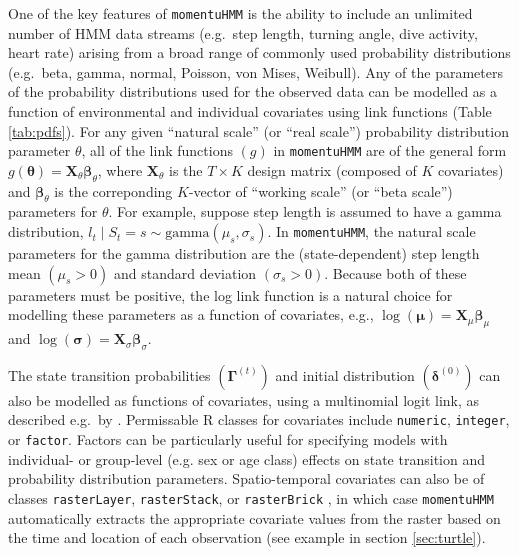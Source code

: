 \documentclass[12pt]{article}\usepackage[]{graphicx}\usepackage[]{color}
\begin{document}
One of the key features of \verb|momentuHMM| is the ability to include an unlimited number of HMM data streams (e.g.\ step length, turning angle, dive activity, heart rate) arising from a broad range of commonly used probability distributions (e.g.\ beta, gamma, normal, Poisson, von Mises, Weibull). Any of the parameters of the probability distributions used for the observed data can be modelled as a function of environmental and individual covariates using link functions (Table \ref{tab:pdfs}). For any given ``natural scale'' (or ``real scale'') probability distribution parameter $\theta$, all of the link functions $(g)$ in \verb|momentuHMM| are of the general form $g({\boldsymbol \theta}) =  {\mathbf X}_\theta{\boldsymbol \beta}_\theta$, where ${\mathbf X}_\theta$ is the $T \times K$ design matrix (composed of $K$ covariates) and ${\boldsymbol \beta}_\theta$ is the correponding $K$-vector of ``working scale'' (or ``beta scale'') parameters for $\theta$. For example, suppose step length is assumed to have a gamma distribution, $l_t\mid S_t=s \sim \text{gamma}(\mu_s,\sigma_s)$. In \verb|momentuHMM|, the natural scale parameters for the gamma distribution are the (state-dependent) step length mean $(\mu_s>0)$ and standard deviation $(\sigma_s>0)$.  Because both of these parameters must be positive, the log link function is a natural choice for modelling these parameters as a function of covariates, e.g., $\log({\boldsymbol \mu}) =  {\mathbf X}_\mu  {\boldsymbol \beta}_\mu$ and $\log({\boldsymbol \sigma}) =  {\mathbf X}_\sigma  {\boldsymbol \beta}_\sigma$.

The state transition probabilities $({\mathbf \Gamma}^{(t)})$ and initial distribution $({\boldsymbol \delta}^{(0)})$ can also be modelled as functions of covariates, using a multinomial logit link, as described e.g.\ by \cite{MichelotEtAl2016}. Permissable R classes for covariates include \verb|numeric|, \verb|integer|, or \verb|factor|. Factors can be particularly useful for specifying models with individual- or group-level (e.g. sex or age class) effects on state transition and probability distribution parameters. Spatio-temporal covariates can also be of classes \verb|rasterLayer|, \verb|rasterStack|, or \verb|rasterBrick| \citep{Hijmans2016}, in which case \verb|momentuHMM| automatically extracts the appropriate covariate values from the raster based on the time and location of each observation (see example in section \ref{sec:turtle}).
\end{document}
